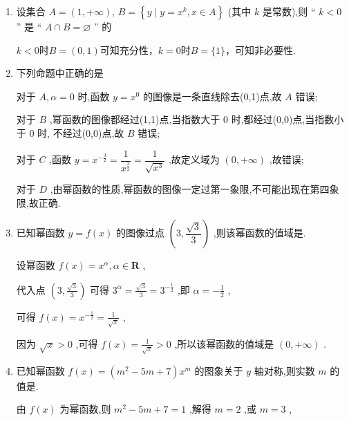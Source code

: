 \begin{enumerate}
\begin{jieda}
        因为 $y = {x}^{\frac{1}{3}}$ 的定义域为 $\mathbf{R}$ 且为奇函数,故应为图.
    \end{jieda}
    \item 设集合 $A = (1, +\infty)$, $B = \left\{  {y \mid  y = {x}^{k},x \in  A}\right\}$ (其中 $k$ 是常数),则 “ $k < 0$ ” 是 “ $A \cap  B = \varnothing$ ” 的
    \begin{jieda}
        $k < 0$时$B = (0, 1)$可知充分性，$k = 0$时$B = \{1\}$，可知非必要性.
    \end{jieda}
    \item 下列命题中正确的是  
    \begin{jieda}
        对于 ${A},\alpha  = 0$ 时,函数 $y = {x}^{0}$ 的图像是一条直线除去(0,1)点,故 ${A}$ 错误;
        
        对于 ${B}$ ,幂函数的图像都经过(1,1)点,当指数大于 0 时,都经过(0,0)点,当指数小于 0 时, 不经过(0,0)点,故 ${B}$ 错误;
        
        对于 ${C}$ ,函数 $y = {x}^{-\frac{3}{2}} = \dfrac{1}{{x}^{\frac{3}{2}}} = \dfrac{1}{\sqrt{{x}^{3}}}$ ,故定义域为 $\left( {0, + \infty }\right)$ ,故错误;
        
        对于 ${D}$ ,由幂函数的性质,幂函数的图像一定过第一象限,不可能出现在第四象限,故正确.
    \end{jieda}
    \item 已知幂函数 $y = f\left( x\right)$ 的图像过点 $\left( {3,\dfrac{\sqrt{3}}{3}}\right)$ ,则该幂函数的值域是.
    \begin{jieda}
        设幂函数 $f\left( x\right)  = {x}^{\alpha },\alpha  \in  \mathbf{R}$ ,
        
        代入点 $\left( {3,\frac{\sqrt{3}}{3}}\right)$ 可得 ${3}^{\alpha } = \frac{\sqrt{3}}{3} = {3}^{-\frac{1}{2}}$ ,即 $\alpha  =  - \frac{1}{2}$ ,
        
        可得 $f\left( x\right)  = {x}^{-\frac{1}{2}} = \frac{1}{\sqrt{x}}$ ,
        
        因为 $\sqrt{x} > 0$ ,可得 $f\left( x\right)  = \frac{1}{\sqrt{x}} > 0$ ,所以该幂函数的值域是 $\left( {0, + \infty }\right)$ .
    \end{jieda}
    \item 已知幂函数 $f\left( x\right)  = \left( {{m}^{2} - {5m} + 7}\right) {x}^{m}$ 的图象关于 $y$ 轴对称,则实数 $m$ 的值是.
    \begin{jieda}
        由 $f\left( x\right)$ 为幂函数,则 ${m}^{2} - {5m} + 7 = 1$ ,解得 $m = 2$ ,或 $m = 3$ ,
        

\end{jieda}
\end{enumerate}

